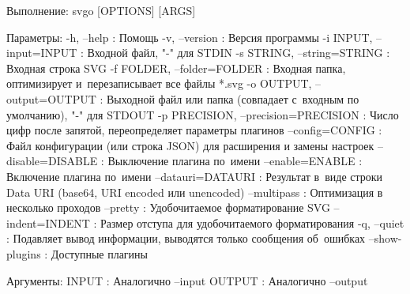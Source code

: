 \begin{DoxyCode}
Выполнение:
  svgo [OPTIONS] [ARGS]

Параметры:
  -h, --help : Помощь
  -v, --version : Версия программы
  -i INPUT, --input=INPUT : Входной файл, "-" для STDIN
  -s STRING, --string=STRING : Входная строка SVG
  -f FOLDER, --folder=FOLDER : Входная папка, оптимизирует и перезаписывает все файлы *.svg
  -o OUTPUT, --output=OUTPUT : Выходной файл или папка (совпадает с входным по умолчанию), "-" для STDOUT
  -p PRECISION, --precision=PRECISION : Число цифр после запятой, переопределяет параметры плагинов
  --config=CONFIG : Файл конфигурации (или строка JSON) для расширения и замены настроек
  --disable=DISABLE : Выключение плагина по имени
  --enable=ENABLE : Включение плагина по имени
  --datauri=DATAURI : Результат в виде строки Data URI (base64, URI encoded или unencoded)
  --multipass : Оптимизация в несколько проходов
  --pretty : Удобочитаемое форматирование SVG
  --indent=INDENT : Размер отступа для удобочитаемого форматирования
  -q, --quiet : Подавляет вывод информации, выводятся только сообщения об ошибках
  --show-plugins : Доступные плагины

Аргументы:
  INPUT : Аналогично --input
  OUTPUT : Аналогично --output
\end{DoxyCode}



